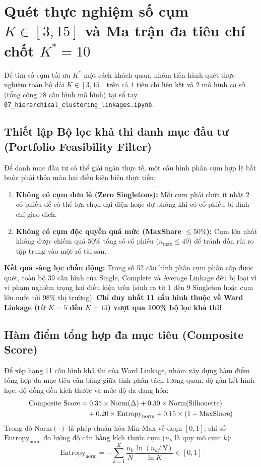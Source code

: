 \documentclass[12pt,a4paper,oneside,openany]{report}
\begin{document}
\section{Quét thực nghiệm số cụm \texorpdfstring{$K \in [3, 15]$}{K in [3, 15]} và Ma trận đa tiêu chí chốt \texorpdfstring{$K^* = 10$}{K* = 10}}
\label{sec:k_sweep}

Để tìm số cụm tối ưu $K^*$ một cách khách quan, nhóm tiến hành quét thực nghiệm toàn bộ dải $K \in [3, 15]$ trên cả 4 tiêu chí liên kết và 2 mô hình cơ sở (tổng cộng 78 cấu hình mô hình) tại sổ tay \texttt{07\_hierarchical\_clustering\_linkages.ipynb}.

\subsection{Thiết lập Bộ lọc khả thi danh mục đầu tư (Portfolio Feasibility Filter)}
Để danh mục đầu tư có thể giải ngân thực tế, một cấu hình phân cụm hợp lệ bắt buộc phải thỏa mãn hai điều kiện biên thực tiễn:
\begin{enumerate}
  \item \textbf{Không có cụm đơn lẻ (Zero Singletons):} Mỗi cụm phải chứa ít nhất 2 cổ phiếu để có thể lựa chọn đại diện hoặc dự phòng khi có cổ phiếu bị đình chỉ giao dịch.
  \item \textbf{Không có cụm độc quyền quá mức (MaxShare $\le 50\%$):} Cụm lớn nhất không được chiếm quá $50\%$ tổng số cổ phiếu ($n_{\max} \le 49$) để tránh dồn rủi ro tập trung vào một rổ tài sản.
\end{enumerate}

\textbf{Kết quả sàng lọc chấn động:}  
Trong số 52 cấu hình phân cụm phân cấp được quét, toàn bộ 39 cấu hình của Single, Complete và Average Linkage đều bị loại vì vi phạm nghiêm trọng hai điều kiện trên (sinh ra từ $1$ đến $9$ Singleton hoặc cụm lớn nuốt tới $98\%$ thị trường). \textbf{Chỉ duy nhất 11 cấu hình thuộc về Ward Linkage (từ $K=5$ đến $K=15$) vượt qua 100\% bộ lọc khả thi!}

\subsection{Hàm điểm tổng hợp đa mục tiêu (Composite Score)}
Để xếp hạng 11 cấu hình khả thi của Ward Linkage, nhóm xây dựng hàm điểm tổng hợp đa mục tiêu cân bằng giữa tính phân tách tương quan, độ gắn kết hình học, độ đồng đều kích thước và mức độ đa dạng hóa:
\begin{align}
  \text{Composite Score} = &\; 0.35 \times \text{Norm}(\Delta) + 0.30 \times \text{Norm}(\text{Silhouette}) \notag \\
  &+ 0.20 \times \text{Entropy}_{\text{norm}} + 0.15 \times (1 - \text{MaxShare})
  \label{eq:composite_score}
\end{align}
Trong đó $\text{Norm}(\cdot)$ là phép chuẩn hóa Min-Max về đoạn $[0, 1]$; chỉ số $\text{Entropy}_{\text{norm}}$ đo lường độ cân bằng kích thước cụm ($n_k$ là quy mô cụm $k$):
\begin{equation}
  \text{Entropy}_{\text{norm}} = -\sum_{k=1}^K \frac{n_k}{N} \frac{\ln(n_k / N)}{\ln K} \in [0, 1]
  \label{eq:entropy_norm}
\end{equation}
\end{document}
